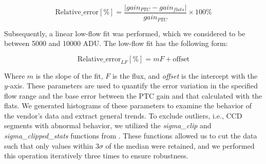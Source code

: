 \begin{equation}
    \mbox{Relative\_error} [\%] = \frac{|gain_{PTC} - gain_{flats}|}{gain_{PTC}} \times 100 \% 
    \label{eq:error_relativo_gain}
\end{equation}

Subsequently, a linear low-flow fit was performed, which we considered to be between 5000 and 10000 ADU. The low-flow fit has the following form:

\begin{equation}
    \mbox{Relative\_error}_{LF} [\%] = m F + \mbox{offset}
\end{equation}

Where $m$ is the slope of the fit, $F$ is the flux, and \textit{offset} is the intercept with the $y$-axis. These parameters are used to quantify the error variation in the specified flow range and the base error between the PTC gain and that calculated with the flats. We generated histograms of these parameters to examine the behavior of the vendor's data and extract general trends. To exclude outliers, i.e., CCD segments with abnormal behavior, we utilized the \textit{sigma\_clip} and \textit{sigma\_clipped\_stats} functions from \cite{price2018astropy}. These functions allowed us to cut the data such that only values within $3 \sigma$ of the median were retained, and we performed this operation iteratively three times to ensure robustness.



